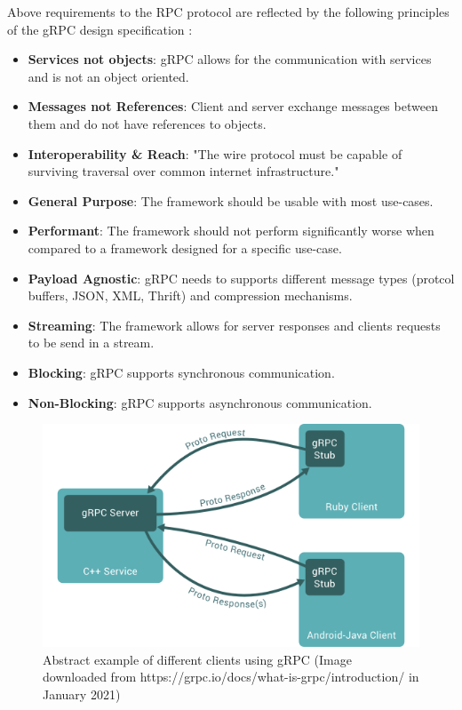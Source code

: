 \documentclass[conference]{IEEEtran}
\begin{document}
Above requirements to the RPC protocol are reflected by the following principles of the gRPC design specification \cite{grpcmotiviation}:

\begin{itemize}
	\item \textbf{Services not objects}: gRPC allows for the communication with services and is not an object oriented.
	\item \textbf{Messages not References}: Client and server exchange messages between them and do not have references to objects.
	\item \textbf{Interoperability \& Reach}: "The wire protocol must be capable of surviving traversal over common internet infrastructure." \cite{grpcmotiviation}
	\item \textbf{General Purpose}: The framework should be usable with most use-cases.
	\item \textbf{Performant}: The framework should not perform significantly worse when compared to a framework designed for a specific use-case.
	\item \textbf{Payload Agnostic}: gRPC needs to supports different message types (protcol buffers, JSON, XML, Thrift) and compression mechanisms.
	\item \textbf{Streaming}: The framework allows for server responses and clients requests to be send in a stream.
	\item \textbf{Blocking}: gRPC supports synchronous communication.
	\item \textbf{Non-Blocking}: gRPC supports asynchronous communication.
\end{itemize}

\begin{figure}
	\centering
	\includegraphics[width=0.8\linewidth]{grpc1.png}
	\caption{Abstract example of different clients using gRPC (Image downloaded from https://grpc.io/docs/what-is-grpc/introduction/ in January 2021)}
	\label{fig:grpcuse}
\end{figure}
\end{document}
